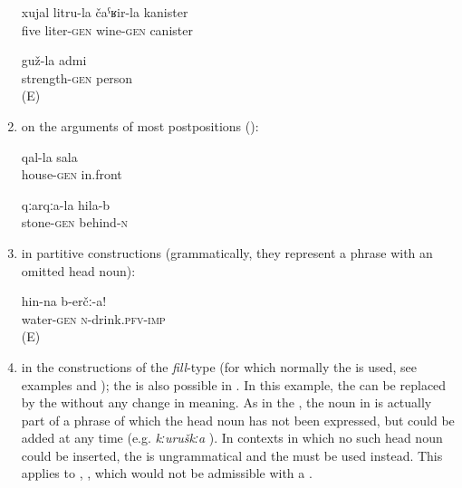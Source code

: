 \begin{enumerate}
\begin{exe}
		\ex	\label{ex:five liter canister of wine}
		\gll	xujal	litru-la		čaˁʁir-la	kanister\\
			five	liter-\textsc{gen}	wine-\textsc{gen}	canister\\
		\glt	{}

		\ex	\label{ex:strong person}
		\gll	guž-la	admi\\
			strength-\textsc{gen}	person\\
		\glt	{} (E)

	\end{exe}

	\item	on the arguments of most postpositions ():
	\begin{exe}
		\ex	\label{ex:in front of the house}
		\gll	qal-la sala\\
			house-\textsc{gen}	in.front\\
		\glt	{}

		\ex	\label{ex:behind the stone}
		\gll	qːarqːa-la	hila-b\\
			stone-\textsc{gen}	behind-\textsc{n}\\
		\glt	{}
	\end{exe}

	\item	in partitive constructions (grammatically, they represent a  phrase with an omitted head noun):
	\begin{exe}
		\ex	\label{ex:Drink (some) water}
		\gll	hin-na	b-erčː-a!\\
			water-\textsc{gen}	\textsc{n}-drink.\textsc{pfv}-\textsc{imp}\\
		\glt	\sqt{Drink (some) water!} (E)
	\end{exe}

\item	in the constructions of the \textit{fill}-type (for which normally the  is used, see examples  and ); the  is also possible in . In this example, the  can be replaced by the  without any change in meaning. As in the , the  noun in  is actually part of a  phrase of which the head noun has not been expressed, but could be added at any time (e.g. \textit{kːuruškːa} ). In contexts in which no such head noun could be inserted, the  is ungrammatical and the  must be used instead. This applies to , , which would not be admissible with a .


\end{enumerate}
